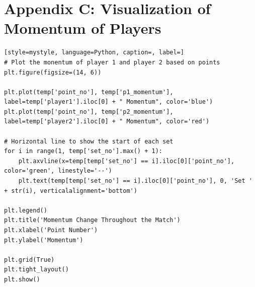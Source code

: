 \documentclass[12pt]{article}
\begin{document}
\section*{Appendix C: Visualization of Momentum of Players}
\begin{lstlisting}[style=mystyle, language=Python, caption=, label=]
# Plot the monentum of player 1 and player 2 based on points
plt.figure(figsize=(14, 6))

plt.plot(temp['point_no'], temp['p1_momentum'], label=temp['player1'].iloc[0] + " Momentum", color='blue')
plt.plot(temp['point_no'], temp['p2_momentum'], label=temp['player2'].iloc[0] + " Momentum", color='red')

# Horizontal line to show the start of each set
for i in range(1, temp['set_no'].max() + 1):
    plt.axvline(x=temp[temp['set_no'] == i].iloc[0]['point_no'], color='green', linestyle='--')
    plt.text(temp[temp['set_no'] == i].iloc[0]['point_no'], 0, 'Set ' + str(i), verticalalignment='bottom')

plt.legend()
plt.title('Momentum Change Throughout the Match')
plt.xlabel('Point Number')
plt.ylabel('Momentum')

plt.grid(True)
plt.tight_layout()
plt.show()
\end{lstlisting}

\end{document}

